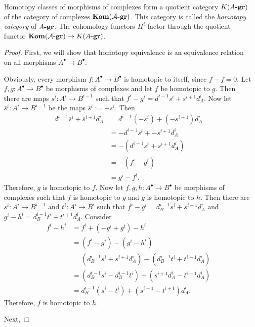 \begin{theorem}\label{def:homCat}
    Homotopy classes of morphisms of complexes form a quotient category $K(A\textrm{\textup{\textbf{-gr}}})$ of the category of complexes $\textrm{\textup{\textbf{Kom}}}(\mathcal{A\textrm{\textup{\textbf{-gr}}}})$.
    This category is called the \textit{homotopy category} of $A\textrm{\textup{\textbf{-gr}}}$.
    The cohomology functors $H^i$ factor through the quotient functor $\textrm{\textup{\textbf{Kom}}}(\mathcal{A\textrm{\textup{\textbf{-gr}}}}) \rightarrow K(A\textrm{\textup{\textbf{-gr}}})$.
\end{theorem}

\begin{proof}
    First, we will show that homotopy equivalence is an equivalence relation on all morphisms $A^\bullet \rightarrow B^\bullet$.
    
    Obviously, every morphism $f: A^\bullet \rightarrow B^\bullet$ is homotopic to itself, since $f - f = 0$.
    Let $f,g: A^\bullet \rightarrow B^\bullet$ be morphisms of complexes and let $f$ be homotopic to $g$.
    Then there are maps $s^i: A^i \rightarrow B^{i-1}$ such that $f^i - g^i = d^{i-1}s^i + s^{i+1}d^i_A$.
    Now let $\overline{s}^i: A^i \rightarrow B^{i-1}$ be the maps $\overline{s}^i := -s^i$.
    Then
    \begin{align*}
        d^{i-1}\overline{s}^i + \overline{s}^{i+1}d^i_A &= d^{i-1}(-s^i) + (-s^{i+1})d^i_A \\
        &= - d^{i-1}s^i + -s^{i+1}d^i_A \\
        &= -(d^{i-1}s^i + s^{i+1}d^i_A) \\
        &= -(f^i - g^i) \\
        &= g^i - f^i.
    \end{align*}
    Therefore, $g$ is homotopic to $f$.
    Now let $f,g,h: A^\bullet \rightarrow B^\bullet$ be morphisms of complexes such that $f$ is homotopic to $g$ and $g$ is homotopic to $h$.
    Then there are $s^i: A^i \rightarrow B^{i-1}$ and $t^i: A^i \rightarrow B^i$ such that $f^i-g^i = d^{i-1}_Bs^i + s^{i+1}d^i_A$ and $g^i-h^i = d^{i-1}_Bt^i + t^{i+1}d^i_A$.
    Consider
    \begin{align*}
        f^i - h^i &= f^i + (-g^i + g^i) - h^i \\
        &= (f^i - g^i) - (g^i - h^i) \\
        &= (d^{i-1}_Bs^i + s^{i+1}d^i_A) - (d^{i-1}_Bt^i + t^{i+1}d^i_A) \\
        &= (d^{i-1}_Bs^i - d^{i-1}_Bt^i) + (s^{i+1}d^i_A - t^{i+1}d^i_A) \\
        &= d^{i-1}_B(s^i - t^i) + (s^{i+1} - t^{i+1})d^i_A.
    \end{align*}
    Therefore, $f$ is homotopic to $h$.

    Next, 
\end{proof}
